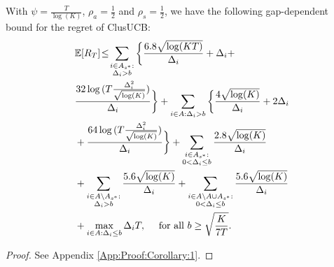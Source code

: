 \begin{corollary}
\label{Result:Corollary:1}
With $\psi=\frac{T}{\log (K)}$, $\rho_{a}=\frac{1}{2}$ and $\rho_{s}=\frac{1}{2}$,  we have the following gap-dependent bound for the regret of ClusUCB:
\begin{align*}
&\mathbb{E} [R_T] \!\le\! 
\sum_{\substack{i\in A_{s^{*}}:\\\Delta_{i} > b}}\bigg\lbrace \frac{6.8\sqrt{\log (KT)}}{\Delta_{i}} + \Delta_{i} + \\
& \frac{32\log{(T\frac{\Delta_{i}^{2}}{\sqrt{\log (K)}})}}{\Delta_{i}} \bigg\rbrace + \sum_{i\in A:\Delta_{i} > b}\bigg\lbrace\frac{4\sqrt{\log (K)}}{\Delta_{i}} + 2\Delta_{i} \\
& + \frac{64\log{(T\frac{\Delta_{i}^{2}}{\sqrt{\log (K)}})}}{\Delta_{i}}\bigg\rbrace
	  + \sum\limits_{\substack{i\in A_{s^{*}}:\\0< \Delta_{i} \leq b}}\frac{2.8\sqrt{\log (K)}}{\Delta_{i}}\\
	& + \sum\limits_{\substack{i\in A\setminus A_{s^{*}}:\\\Delta_{i} > b}}\frac{5.6\sqrt{\log (K)}}{\Delta_{i}} + \sum\limits_{\substack{i\in A\setminus A \cup A_{s^{*}}:\\0 < \Delta_{i}\leq b}}\frac{5.6\sqrt{\log (K)}}{\Delta_{i}} \\
	& + \max\limits_{i\in A:\Delta_{i}\leq b}\Delta_{i}T, \quad \text{ for all }b\geq \sqrt{\frac{K}{7T}}.
	\end{align*} 
\end{corollary}
\begin{proof}
 See Appendix \ref{App:Proof:Corollary:1}.
\end{proof}

